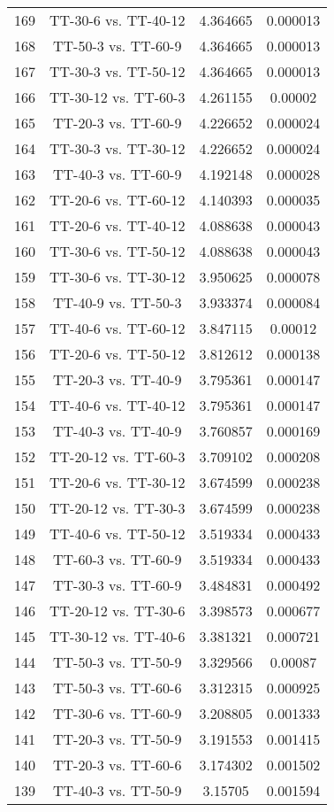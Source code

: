 \documentclass[a4paper,10pt]{article}
\begin{document}
\begin{landscape}
\begin{table}[!htp]
\begin{tabular}{cccc}
169&TT-30-6 vs. TT-40-12&4.364665&0.000013\\
168&TT-50-3 vs. TT-60-9&4.364665&0.000013\\
167&TT-30-3 vs. TT-50-12&4.364665&0.000013\\
166&TT-30-12 vs. TT-60-3&4.261155&0.00002\\
165&TT-20-3 vs. TT-60-9&4.226652&0.000024\\
164&TT-30-3 vs. TT-30-12&4.226652&0.000024\\
163&TT-40-3 vs. TT-60-9&4.192148&0.000028\\
162&TT-20-6 vs. TT-60-12&4.140393&0.000035\\
161&TT-20-6 vs. TT-40-12&4.088638&0.000043\\
160&TT-30-6 vs. TT-50-12&4.088638&0.000043\\
159&TT-30-6 vs. TT-30-12&3.950625&0.000078\\
158&TT-40-9 vs. TT-50-3&3.933374&0.000084\\
157&TT-40-6 vs. TT-60-12&3.847115&0.00012\\
156&TT-20-6 vs. TT-50-12&3.812612&0.000138\\
155&TT-20-3 vs. TT-40-9&3.795361&0.000147\\
154&TT-40-6 vs. TT-40-12&3.795361&0.000147\\
153&TT-40-3 vs. TT-40-9&3.760857&0.000169\\
152&TT-20-12 vs. TT-60-3&3.709102&0.000208\\
151&TT-20-6 vs. TT-30-12&3.674599&0.000238\\
150&TT-20-12 vs. TT-30-3&3.674599&0.000238\\
149&TT-40-6 vs. TT-50-12&3.519334&0.000433\\
148&TT-60-3 vs. TT-60-9&3.519334&0.000433\\
147&TT-30-3 vs. TT-60-9&3.484831&0.000492\\
146&TT-20-12 vs. TT-30-6&3.398573&0.000677\\
145&TT-30-12 vs. TT-40-6&3.381321&0.000721\\
144&TT-50-3 vs. TT-50-9&3.329566&0.00087\\
143&TT-50-3 vs. TT-60-6&3.312315&0.000925\\
142&TT-30-6 vs. TT-60-9&3.208805&0.001333\\
141&TT-20-3 vs. TT-50-9&3.191553&0.001415\\
140&TT-20-3 vs. TT-60-6&3.174302&0.001502\\
139&TT-40-3 vs. TT-50-9&3.15705&0.001594\\

\end{tabular}
\end{table}
\end{landscape}
\end{document}
